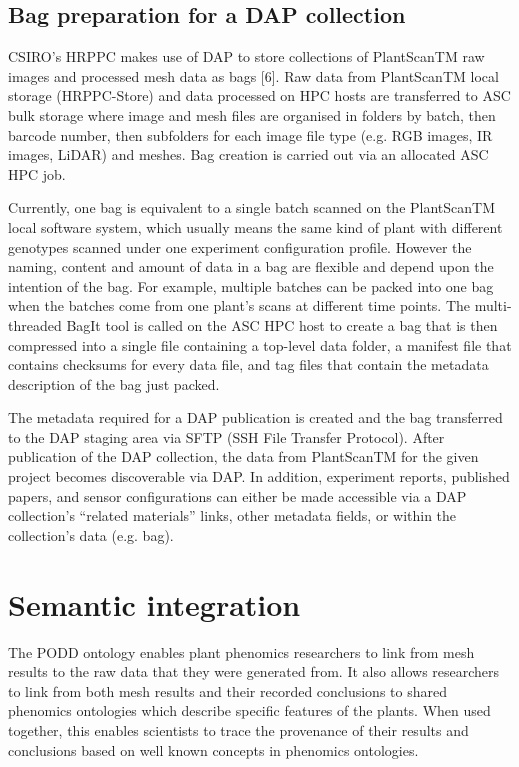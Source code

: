 \documentclass{llncs}
\begin{document}
\subsection{Bag preparation for a DAP collection}
CSIRO’s HRPPC makes use of DAP to store collections of PlantScanTM raw images
and processed mesh data as bags [6]. Raw data from PlantScanTM local storage
(HRPPC-Store) and data processed on HPC hosts are transferred to ASC bulk
storage where image and mesh files are organised in folders by batch, then
barcode number, then subfolders for each image file type (e.g. RGB images, IR
images, LiDAR) and meshes. Bag creation is carried out via an allocated ASC HPC
job.


Currently, one bag is equivalent to a single batch scanned on the PlantScanTM
local software system, which usually means the same kind of plant with different
genotypes scanned under one  experiment configuration profile.  However the
naming, content and amount of data in a bag are flexible and depend upon the
intention of the bag. For example, multiple batches can be packed into one bag
when the batches come from one plant’s scans at different time points. The
multi-threaded BagIt tool is called on the ASC HPC host to create a bag that is
then compressed into a single file containing a top-level data folder, a
manifest file that contains checksums for every data file, and tag files that
contain the metadata description of the bag just packed. 


The metadata required for a DAP publication is created and the bag transferred
to the DAP staging area via SFTP (SSH File Transfer Protocol). After publication
of the DAP collection, the data from PlantScanTM for the given project becomes
discoverable via DAP. In addition, experiment reports, published papers, and
sensor configurations can either be made accessible via a DAP collection's
``related materials'' links, other metadata fields, or within the collection's
data (e.g. bag).


\section{Semantic integration}
The PODD ontology enables plant phenomics researchers to link from mesh results
to the raw data that they were generated from. It also allows researchers to
link from both mesh results and their recorded conclusions to shared phenomics
ontologies which describe specific features of the plants. When used together,
this enables scientists to trace the provenance of their results and conclusions
based on well known concepts in phenomics ontologies.
\end{document}
